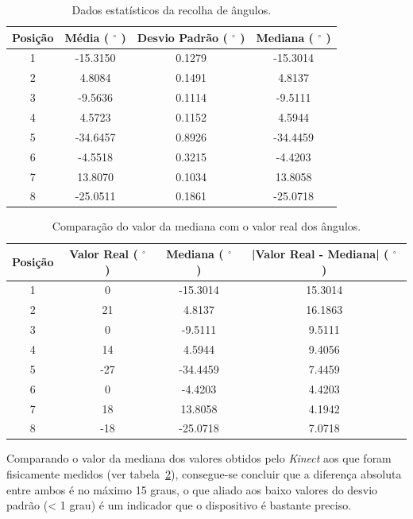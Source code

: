 \begin{table}[!h]
\begin{center}
\begin{tabular} { c c c c }
 Posição & Média ( $^\circ$ ) & Desvio Padrão  ( $^\circ$ ) & Mediana  ( $^\circ$ ) \\
\hline
	1 & -15.3150 &0.1279 & -15.3014 \\
	2 & 4.8084 &0.1491 & 4.8137 \\
	3 &  -9.5636 &0.1114 &-9.5111\\
	4 &  4.5723 &0.1152 & 4.5944 \\
	5 & -34.6457 &0.8926 &-34.4459 \\
	6 & -4.5518 & 0.3215 &-4.4203 \\
	7 & 13.8070 & 0.1034 &  13.8058 \\
	8 & -25.0511 & 0.1861 &  -25.0718 \\
\hline
\end{tabular}
	\caption{Dados estatísticos da recolha de ângulos.}
	\label{res:exp_res_obtidos_est_ang}
\end{center}
\end{table}


\begin{table}[!h]
\begin{center}
\begin{tabular} { c c c c }
 Posição & Valor Real ( $^\circ$ ) & Mediana ( $^\circ$ ) & |Valor Real - Mediana| ( $^\circ$ ) \\
\hline
	1 & 0 & -15.3014 & 15.3014 \\
	2 & 21 & 4.8137 & 16.1863 \\
	3 & 0 & -9.5111& 9.5111\\
	4 & 14 & 4.5944 & 9.4056\\
	5 & -27 & -34.4459 & 7.4459 \\
	6 & 0 & -4.4203 & 4.4203 \\
	7 & 18 & 13.8058 & 4.1942 \\
	8 & -18 & -25.0718 & 7.0718 \\
\hline
\end{tabular}
	\caption{Comparação do valor da mediana com o valor real dos ângulos.}
	\label{res:exp_res_obtidos_est_ang_comp}
\end{center}
\end{table}



Comparando o valor da mediana dos valores obtidos pelo \emph{Kinect} aos que foram fisicamente medidos (ver tabela~\ref{res:exp_res_obtidos_est_ang_comp}), consegue-se concluir que a diferença absoluta entre ambos é no máximo 15 graus, o que aliado aos baixo valores do desvio padrão (< 1 grau) é um indicador que o dispositivo é bastante preciso. 

